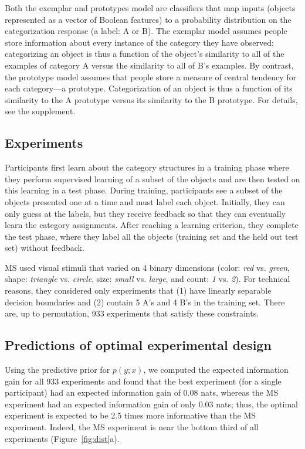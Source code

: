 \documentclass{article}
\begin{document}
Both the exemplar and prototypes model are classifiers that map inputs (objects represented as a vector of Boolean features) to a probability distribution on the categorization response (a label: A or B).
The exemplar model assumes people store information about every instance of the category they have observed; categorizing an object is thus a function of the object's similarity to all of the examples of category A versus the similarity to all of B's examples.
By contrast, the prototype model assumes that people store a measure of central tendency for each category---a prototype.
Categorization of an object is thus a function of its similarity to the A prototype versus its similarity to the B prototype.
For details, see the supplement.

\subsection{Experiments}

Participants first learn about the category structures in a training phase where they perform supervised learning of a subset of the objects and are then tested on this learning in a test phase.
During training, participants see a subset of the objects presented one at a time and must label each object.
Initially, they can only guess at the labels, but they receive feedback so that they can eventually learn the category assignments.
After reaching a learning criterion, they complete the test phase, where they label all the objects (training set and the held out test set) without feedback.

MS used visual stimuli that varied on 4 binary dimensions (color: \emph{red} vs. \emph{green}, shape: \emph{triangle} vs. \emph{circle}, size: \emph{small} vs. \emph{large}, and count: \emph{1} vs. \emph{2}).
For technical reasons, they considered only experiments that (1) have linearly separable decision boundaries and (2) contain 5 A's and 4 B's in the training set.
There are, up to permutation, 933 experiments that satisfy these constraints.

\subsection{Predictions of optimal experimental design}

Using the predictive prior for $p(y; x)$, we computed the expected information gain for all 933 experiments and found that the best experiment (for a single participant) had an expected information gain of 0.08 nats, whereas the MS experiment had an expected information gain of only 0.03 nats; thus, the optimal experiment is expected to be 2.5 times more informative than the MS experiment.
Indeed, the MS experiment is near the bottom third of all experiments (Figure~\ref{fig:dist}a).
\end{document}
